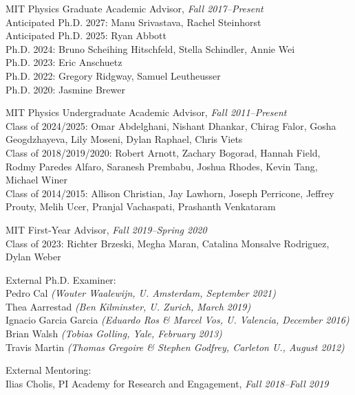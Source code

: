 \item MIT Physics Graduate Academic Advisor, \emph{Fall 2017--Present}
\\ Anticipated Ph.D. 2027: Manu Srivastava, Rachel Steinhorst
\\ Anticipated Ph.D. 2025: Ryan Abbott
\\ Ph.D. 2024: Bruno Scheihing Hitschfeld, Stella Schindler, Annie Wei
\\ Ph.D. 2023: Eric Anschuetz
\\ Ph.D. 2022: Gregory Ridgway, Samuel Leutheusser
\\ Ph.D. 2020: Jasmine Brewer
\item MIT Physics Undergraduate Academic Advisor, \emph{Fall 2011--Present}
\\ Class of 2024/2025: Omar Abdelghani, Nishant Dhankar, Chirag Falor, Gosha Geogdzhayeva, Lily Moseni, Dylan Raphael, Chris Viets
\\ Class of 2018/2019/2020: Robert Arnott, Zachary Bogorad, Hannah Field, Rodmy Paredes Alfaro, Saranesh Prembabu, Joshua Rhodes, Kevin Tang, Michael Winer
\\ Class of 2014/2015: Allison Christian, Jay Lawhorn, Joseph Perricone, Jeffrey Prouty, Melih Ucer, Pranjal Vachaspati, Prashanth Venkataram
\item MIT First-Year Advisor, \emph{Fall 2019--Spring 2020}
\\ Class of 2023: Richter Brzeski, Megha Maran, Catalina Monsalve Rodriguez, Dylan Weber

\item External Ph.D. Examiner:
\\ Pedro Cal \textit{(Wouter Waalewijn, U. Amsterdam, September 2021)}
\\ Thea Aarrestad \textit{(Ben Kilminster, U. Zurich, March 2019)}
\\ Ignacio Garcia Garcia \textit{(Eduardo Ros \& Marcel Vos, U. Valencia, December 2016)}
\\ Brian Walsh \textit{(Tobias Golling, Yale, February 2013)}
\\ Travis Martin \textit{(Thomas Gregoire \& Stephen Godfrey, Carleton U., August 2012)}

\item External Mentoring:
\\ Ilias Cholis, PI Academy for Research and Engagement, \emph{Fall 2018--Fall 2019}

\el
